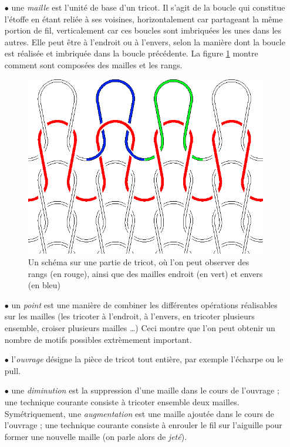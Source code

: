 \documentclass{article}
\begin{document}
\begin{itemize}
\item[$\bullet$] une \emph{maille} est l'unité de base d'un tricot. Il s'agit de
  la boucle qui constitue l'étoffe en étant reliée à ses voisines,
  horizontalement car partageant la même portion de fil, verticalement
  car ces boucles sont imbriquées les unes dans les autres. Elle peut
  être à l'endroit ou à l'envers, selon la manière dont la boucle est
  réalisée et imbriquée dans la boucle précédente. La figure \ref{maille} 
  montre comment sont composées des mailles et les rangs.

\begin{figure}[!ht]
  \centering \includegraphics[scale=0.25]{../presentation/Knit-schematic2.png}
  \caption{Un schéma sur une partie de tricot, où l'on peut observer des rangs 
  (en rouge), ainsi que des mailles endroit (en vert) et envers (en bleu)}
  \label{maille}
\end{figure}

\item[$\bullet$] un \emph{point} est une manière de combiner les différentes
  opérations réalisables sur les mailles (les tricoter à l'endroit, à
  l'envers, en tricoter plusieurs ensemble, croiser plusieurs mailles
  \dots) Ceci montre que l'on peut obtenir un nombre de motifs possibles 
  extrèmement important.
\item[$\bullet$] l'\emph{ouvrage} désigne la pièce de tricot tout entière, par
  exemple l'écharpe ou le pull.
\item[$\bullet$] une \emph{diminution} est la suppression d'une maille dans le
  cours de l'ouvrage ; une technique courante consiste à tricoter
  ensemble deux mailles. Symétriquement, une \emph{augmentation} est
  une maille ajoutée dans le cours de l'ouvrage ; une technique
  courante consiste à enrouler le fil sur l'aiguille pour former une
  nouvelle maille (on parle alors de \emph{jeté}).
\end{itemize}
\end{document}
